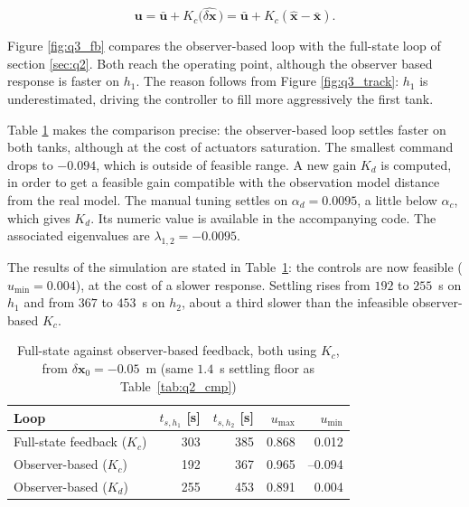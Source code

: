 \documentclass[10pt,a4paper]{scrartcl}
\begin{document}
\begin{equation}
    \bm{u}=\bar{\bm{u}}+K_c\big(\widehat{\delta\bm{x}}\,\big)
          =\bar{\bm{u}}+K_c(\hat{\bm{x}}-\bar{\bm{x}}).
    \label{eq:q3_fb}
\end{equation}

Figure \ref{fig:q3_fb} compares the observer-based loop with the full-state loop of section \ref{sec:q2}. Both reach the  operating point, although the observer based response is faster on $h_1$. The reason follows from Figure \ref{fig:q3_track}: $h_1$ is underestimated, driving the controller to fill more aggressively the first tank. 

Table \ref{tab:q3_cmp} makes the comparison precise: the observer-based loop settles faster on both tanks, although at the cost of actuators saturation. The smallest command drops to $-0.094$, which is outside of feasible range. A new gain $K_d$ is computed, in order to get a feasible gain compatible with the observation model distance from the real model. The manual tuning settles on $\alpha_d=0.0095$, a little below $\alpha_c$, which gives $K_d$. Its numeric value is available in the accompanying code. The associated eigenvalues are $\lambda_{1,2}=-0.0095$. 

The results of the simulation are stated in Table~\ref{tab:q3_cmp}: the controls are now feasible ($u_{\min}=0.004$), at the cost of a slower
response. Settling rises from $192$ to $255$~s on $h_1$ and from $367$ to $453$~s on $h_2$, about a third slower than the infeasible observer-based $K_c$.



\begin{table}[htbp]
    \centering
    \small
    \renewcommand{\arraystretch}{1.1}
    \begin{tabular}{l r r r r}
        \toprule
        Loop & \large $t_{s,h_1}$ \normalsize[s] & \large $t_{s,h_2}$ \normalsize [s] & $u_{\text{max}}$ & $u_{\text{min}}$ \\
        \midrule
        Full-state feedback ($K_c$)   & 303 & 385 & 0.868 & \phantom{$-$}0.012 \\
        Observer-based ($K_c$)        & 192 & 367 & 0.965 & --0.094         \\
        Observer-based ($K_d$)        & 255 & 453 & 0.891 & \phantom{$-$}0.004 \\
        \bottomrule
    \end{tabular}
    \caption{Full-state against observer-based feedback, both using $K_c$,
    from $\delta\bm{x}_0=-0.05$~m (same $1.4$~s settling floor as
    Table~\ref{tab:q2_cmp})}
    \label{tab:q3_cmp}
\end{table}


   
\end{document}
